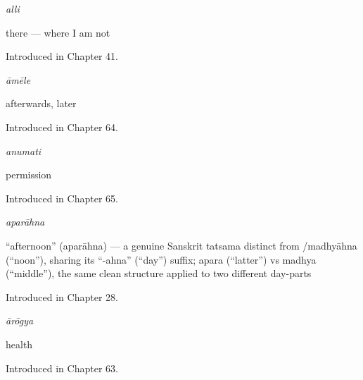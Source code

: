 \noindent\begin{minipage}[t]{\linewidth}
\raggedright
\textbf{}\enspace\emph{alli}\par
\small there — where I am not\par
\footnotesize Introduced in Chapter 41.
\end{minipage}\par\medskip

\noindent\begin{minipage}[t]{\linewidth}
\raggedright
\textbf{}\enspace\emph{āmēle}\par
\small afterwards, later\par
\footnotesize Introduced in Chapter 64.
\end{minipage}\par\medskip

\noindent\begin{minipage}[t]{\linewidth}
\raggedright
\textbf{}\enspace\emph{anumati}\par
\small permission\par
\footnotesize Introduced in Chapter 65.
\end{minipage}\par\medskip

\noindent\begin{minipage}[t]{\linewidth}
\raggedright
\textbf{}\enspace\emph{aparāhna}\par
\small \textquotedblleft{}afternoon\textquotedblright{} (aparāhna) — a genuine Sanskrit tatsama distinct from /madhyāhna (\textquotedblleft{}noon\textquotedblright{}), sharing its \textquotedblleft{}-ahna\textquotedblright{} (\textquotedblleft{}day\textquotedblright{}) suffix; apara (\textquotedblleft{}latter\textquotedblright{}) vs madhya (\textquotedblleft{}middle\textquotedblright{}), the same clean structure applied to two different day-parts\par
\footnotesize Introduced in Chapter 28.
\end{minipage}\par\medskip

\noindent\begin{minipage}[t]{\linewidth}
\raggedright
\textbf{}\enspace\emph{ārōgya}\par
\small health\par
\footnotesize Introduced in Chapter 63.
\end{minipage}\par\medskip

